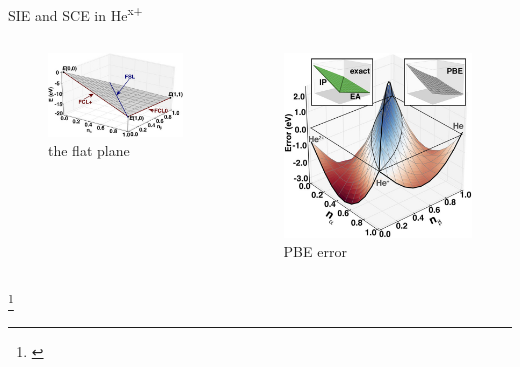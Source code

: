 \documentclass[xcolor=table,aspectratio=169]{beamer}
\newcommand\blfootcite[1]{%
  \begingroup
  \renewcommand\thefootnote{}\footnote{\hspace{-4ex}\cite{#1}}%
  \addtocounter{footnote}{-1}%
  \endgroup
}
\numberwithin{equation}{section}
\begin{document}
\begin{frame}{SIE and SCE in He\textsuperscript{x+}}
    \renewcommand{\figurename}{}
    \begin{columns}

        \begin{figure}[h!]
            \includegraphics[width=\columnwidth]{figures/fig_bajaj_abstracted_2d_pwl.jpg}
            \caption{the flat plane}
        \end{figure}

        \begin{figure}
            \includegraphics[width=\columnwidth]{figures/fig_bajaj_2d_pwl.jpeg}
            \caption{PBE error}
        \end{figure}

    \end{columns}
    \blfootcite{Bajaj2017}

\end{frame}
\end{document}
